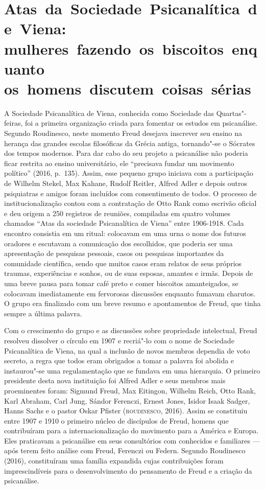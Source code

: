 \section{Atas~da~Sociedade~Psicanalítica~de~Viena: mulheres~fazendo~os~biscoitos~enquanto os~homens~discutem~coisas~sérias}

A Sociedade Psicanalítica de Viena, conhecida como Sociedade das
Quartas"-feiras, foi a primeira organização criada para fomentar os
estudos em psicanálise. Segundo Roudinesco, neste momento Freud
desejava inscrever seu ensino na herança das grandes escolas filosóficas
da Grécia antiga, tornando"-se o Sócrates dos tempos modernos. Para dar
cabo do seu projeto a psicanálise não poderia ficar restrita ao ensino
universitário, ele ``precisava fundar um movimento político'' (2016, p.~135).
Assim, esse pequeno grupo iniciava com a participação de Wilhelm Stekel,
Max Kahane, Rudolf Reitler, Alfred Adler e depois outros psiquiatras e
amigos foram incluídos com consentimento de todos. O processo de
institucionalização contou com a contratação de Otto Rank como escrivão
oficial e deu origem a 250 registros de reuniões, compiladas em quatro
volumes chamados ``Atas da sociedade Psicanalítica de Viena'' entre
1906-1918. Cada encontro consistia em um ritual: colocavam em uma urna o
nome dos futuros oradores e escutavam a comunicação dos escolhidos, que
poderia ser uma apresentação de pesquisas pessoais, casos ou pesquisas
importantes da comunidade científica, sendo que muitos casos eram
relatos de seus próprios traumas, experiências e sonhos, ou de suas
esposas, amantes e irmãs. Depois de uma breve pausa para tomar café
preto e comer biscoitos amanteigados, se colocavam imediatamente em
fervorosas discussões enquanto fumavam charutos. O grupo era finalizado
com um breve resumo e apontamentos de Freud, que tinha sempre a última
palavra.

Com o crescimento do grupo e as discussões sobre propriedade
intelectual, Freud resolveu dissolver o círculo em 1907 e recriá"-lo com
o nome de Sociedade Psicanalítica de Viena, na qual a inclusão de novos
membros dependia de voto secreto, a regra que todos eram obrigados a
tomar a palavra foi abolida e instaurou"-se uma regulamentação que se
fundava em uma hierarquia. O primeiro presidente desta nova instituição
foi Alfred Adler e seus membros mais proeminentes foram: Sigmund Freud,
Max Eitingon, Wilhelm Reich, Otto Rank, Karl Abraham, Carl Jung, Sándor
Ferenczi, Ernest Jones, Isidor Isaak Sadger, Hanns Sachs e o pastor
Oskar Pfister (\textsc{roudinesco}, 2016). Assim se constituiu entre 1907 e 1910
o primeiro núcleo de discípulos de Freud, homens que contribuíram para a
internacionalização do movimento para a América e Europa. Eles
praticavam a psicanálise em seus consultórios com conhecidos e
familiares --- após terem feito análise com Freud, Ferenczi ou Federn.
Segundo Roudinesco (2016), constituíram uma família expandida cujas
contribuições foram imprescindíveis para o desenvolvimento do pensamento
de Freud e a criação da psicanálise.

